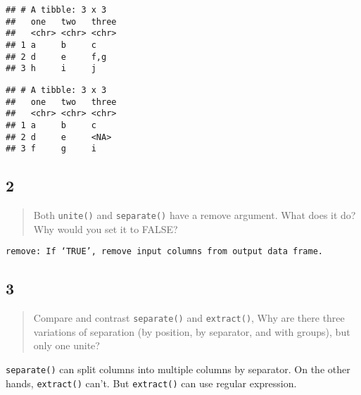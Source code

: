 \documentclass[]{ltjsarticle}
\newenvironment{Shaded}{\begin{snugshade}}{\end{snugshade}}
\newcommand{\DataTypeTok}[1]{\textcolor[rgb]{0.13,0.29,0.53}{#1}}
\newcommand{\KeywordTok}[1]{\textcolor[rgb]{0.13,0.29,0.53}{\textbf{#1}}}
\newcommand{\NormalTok}[1]{#1}
\newcommand{\OperatorTok}[1]{\textcolor[rgb]{0.81,0.36,0.00}{\textbf{#1}}}
\newcommand{\StringTok}[1]{\textcolor[rgb]{0.31,0.60,0.02}{#1}}
\begin{document}
\begin{verbatim}
## # A tibble: 3 x 3
##   one   two   three
##   <chr> <chr> <chr>
## 1 a     b     c    
## 2 d     e     f,g  
## 3 h     i     j
\end{verbatim}

\begin{Shaded}
\end{Shaded}

\begin{verbatim}
## # A tibble: 3 x 3
##   one   two   three
##   <chr> <chr> <chr>
## 1 a     b     c    
## 2 d     e     <NA> 
## 3 f     g     i
\end{verbatim}

\hypertarget{section-11}{%
\subsection{2}\label{section-11}}

\begin{quote}
Both \texttt{unite()} and \texttt{separate()} have a remove argument.
What does it do? Why would you set it to FALSE?
\end{quote}

\texttt{remove:\ If\ ‘TRUE’,\ remove\ input\ columns\ from\ output\ data\ frame.}

\hypertarget{section-12}{%
\subsection{3}\label{section-12}}

\begin{quote}
Compare and contrast \texttt{separate()} and \texttt{extract()}, Why are
there three variations of separation (by position, by separator, and
with groups), but only one unite?
\end{quote}

\texttt{separate()} can split columns into multiple columns by
separator. On the other hands, \texttt{extract()} can't. But
\texttt{extract()} can use regular expression.
\end{document}
